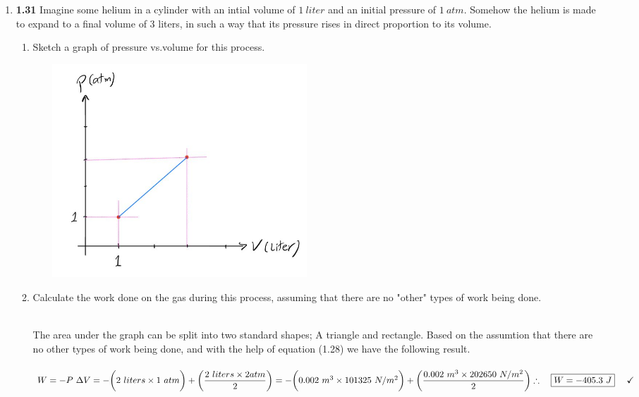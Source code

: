 \documentclass[fleqn]{article}
\begin{document}
\begin{enumerate}
    \pagebreak

    \item \textbf{1.31} Imagine some helium in a cylinder with an intial volume of $1 ~ liter$ and an initial
    pressure of $1 ~ atm$. Somehow the helium is made to expand to a final volume of 3 liters, in such a way 
    that its pressure rises in direct proportion to its volume.
    \begin{enumerate}
      \item Sketch a graph of pressure vs.volume for this process.

      \begin{center}
        \includegraphics[height=8cm, width=11cm]{2.JPG}
      \end{center}

      \item Calculate the work done on the gas during this process, assuming that there are no "other"
      types of work being done.

        \textcolor{hwColor}{
          \\
          The area under the graph can be split into two standard shapes; A triangle and rectangle. Based on the assumtion 
          that there are no other types of work being done, and with the help of equation (1.28) we have the following result. 
          \\
          \\
          $
            W=-P ~ \Delta V=-\bigg( 2 ~ liters \times 1 ~ atm\bigg)+ \bigg( \dfrac{2 ~ liters \times 2 atm}{2} \bigg)
            \\
            \\
            =-\bigg( 0.002 ~ m^3 \times 101325 ~ N/m^2 \bigg)+ \bigg( \dfrac{ 0.002 ~ m^3 \times 202650 ~ N/m^2 }{2} \bigg)
            \\
            \\
            \\
            \therefore ~~~ \boxed{
              W=-405.3 ~ J
            } ~~~~ \checkmark
            \\
            \\
          $ 
        }


\end{enumerate}
\end{enumerate}
\end{document}
